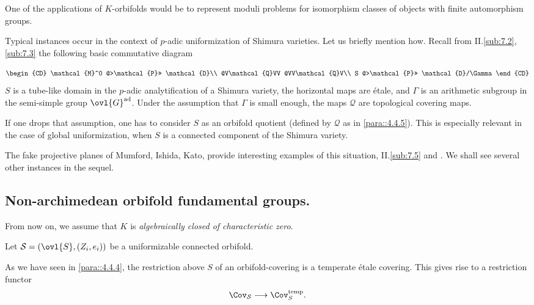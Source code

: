 \begin{para}\label{para::4.4.6} One of the applications of $K$-orbifolds would
 be to represent moduli problems for isomorphism classes of objects with
 finite automorphism groups.

 Typical instances occur in the context of $p$-adic uniformization of
 Shimura varieties. Let us briefly mention how.  Recall from
 II.\ref{sub:7.2}, \ref{sub:7.3}
 the following basic commutative diagram

 \begin{equation*}
  \begin{CD}
   \mathcal{M}^0 @>\mathcal{P}>> \mathcal{D}\\
   @V\mathcal{Q}VV @VV\mathcal{Q}V\\
   S @>\mathcal{P}>> \mathcal{D}/\Gamma
  \end{CD}
 \end{equation*}
$S$ is a tube-like domain in the $p$-adic
 analytification of a Shimura variety, the horizontal maps are \'etale,
and $\Gamma$ is an arithmetic subgroup in the semi-simple group
$\ovl{G}^{\mathrm{ad}}$. Under the assumption that $\Gamma$ is small
enough, the maps $\mathcal{Q}$ are topological covering maps.

If one drops that assumption, one has to consider $S$ as an orbifold
quotient (defined by $\mathcal{Q}$ as in \ref{para::4.4.5}). This is
 especially relevant 
in the case of global uniformization, \ie when $S$ is a connected
component of the Shimura variety.

The fake projective planes of Mumford, Ishida, Kato, provide interesting
examples of this situation, \cf II.\ref{sub:7.5} and \cite{opuofpp}.
We shall see several other instances in the sequel.
\end{para}

\subsection{Non-archimedean orbifold fundamental groups.}\label{sub::4.5}

\medskip From now on, we assume that $K$ is {\it algebraically closed of
characteristic zero}. 

\begin{para}\label{para::4.5.1}  Let $\mathcal{S}=(\ovl{S}, (Z_i,e_i))$
 be a uniformizable connected orbifold.

As we have seen in \ref{para::4.4.4}, the restriction above $S$ of an
 orbifold-covering is a temperate \'etale covering. This gives 
rise to a restriction functor 
\begin{equation*}
   \Cov_\mathcal{S} \longrightarrow \Cov_S^{\mathrm{temp}}.
\end{equation*}
\end{para}

